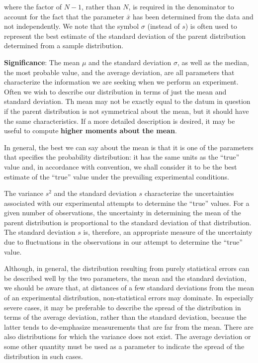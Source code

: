 \documentclass[a4paper,10pt]{article}
\begin{document}
{\noindent}where the factor of $N-1$, rather than $N$, is required in the denominator to account for the fact that the parameter $\bar{x}$ has been determined from the data and not independently. We note that the symbol $\sigma$ (instead of $s$) is often used to represent the best estimate of the standard deviation of the parent distribution determined from a sample distribution.

{\noindent}\textbf{Significance}: The mean $\mu$ and the standard deviation $\sigma$, as well as the median, the most probable value, and the average deviation, are all parameters that characterize the information we are seeking when we perform an experiment. Often we wish to describe our distribution in terms of just the mean and standard deviation. Th mean may not be exactly equal to the datum in question if the parent distribution is not symmetrical about the mean, but it should have the same characteristics. If a more detailed description is desired, it may be useful to compute \textbf{higher moments about the mean}.

{\noindent}In general, the best we can say about the mean is that it is one of the parameters that specifies the probability distribution: it has the same units as the ``true'' value and, in accordance with convention, we shall consider it to be the best estimate of the ``true'' value under the prevailing experimental conditions.

{\noindent}The variance $s^2$ and the standard deviation $s$ characterize the uncertainties associated with our experimental attempts to determine the ``true'' values. For a given number of observations, the uncertainty in determining the mean of the parent distribution is proportional to the standard deviation of that distribution. The standard deviation $s$ is, therefore, an appropriate measure of the uncertainty due to fluctuations in the observations in our attempt to determine the ``true'' value.

{\noindent}Although, in general, the distribution resulting from purely statistical errors can be described well by the two parameters, the mean and the standard deviation, we should be aware that, at distances of a few standard deviations from the mean of an experimental distribution, non-statistical errors may dominate. In especially severe cases, it may be preferable to describe the spread of the distribution in terms of the average deviation, rather than the standard deviation, because the latter tends to de-emphasize measurements that are far from the mean. There are also distributions for which the variance does not exist. The average deviation or some other quantity must be used as a parameter to indicate the spread of the distribution in such cases. 
\end{document}
